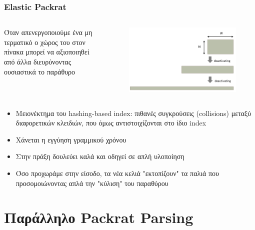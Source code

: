 \documentclass{beamer}
\begin{document}
\begin{frame}
  \frametitle{Elastic Packrat}
\begin{columns}

Όταν απενεργοποιούμε ένα μη τερματικό ο χώρος του στον πίνακα μπορεί να αξιοποιηθεί από άλλα διευρύνοντας ουσιαστικά το παράθυρο

\begin{figure}[h]
    \centering
	\includegraphics[width=1.00\textwidth]{../transcript/pics/elastic_slide_window}
\end{figure} 
\pause
\end{columns}

	\begin{itemize}
	  \item Μειονέκτημα του hashing-based index: πιθανές συγκρούσεις (collisions) μεταξύ διαφορετικών κλειδιών, που όμως αντιστοιχίζονται στο ίδιο index \pause 
	  \item Xάνεται η εγγύηση γραμμικού χρόνου \pause
	  \item Στην πράξη δουλεύει καλά και οδηγεί σε απλή υλοποίηση  \pause
	  \item Όσο προχωράμε στην είσοδο, τα νέα κελιά "εκτοπίζουν" τα παλιά που προσομοιώνοντας απλά την "κύλιση" του παραθύρου
	\end{itemize}
\end{frame}

\section{Παράλληλο Packrat Parsing}
\end{document}
